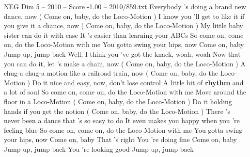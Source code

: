 \begin{textsample}{NEG Dim 5 – 2010 – Score -1.00 – 2010/859.txt}  \label{ex:f5_neg_007}
Everybody 's doing a brand new dance, now ( Come on, baby, do the Loco-Motion ) I know you 'll get to like it if you give it a chance, now ( Come on, baby, do the Loco-Motion ) My little baby sister can do it with ease It 's easier than learning your ABCs So come on, come on, do the Loco-Motion with me You gotta swing your hips, now Come on, baby Jump up, jump back Well, I think you 've got the knack, woah, woah Now that you can do it, let 's make a chain, now ( Come on, baby, do the Loco-Motion ) A chug-a chug-a motion like a railroad train, now ( Come on, baby, do the Loco-Motion ) Do it nice and easy, now, don't lose control A little bit of \textbf{rhythm} and a lot of soul So come on, come on, do the Loco-Motion with me Move around the floor in a Loco-Motion ( Come on, baby, do the Loco-Motion ) Do it holding hands if you get the notion ( Come on, baby, do the Loco-Motion ) There 's never been a dance that 's so easy to do It even makes you happy when you 're feeling blue So come on, come on, do the Loco-Motion with me You gotta swing your hips, now Come on, baby That 's right You 're doing fine Come on, baby Jump up, jump back You 're looking good Jump up, jump back

\end{textsample}
